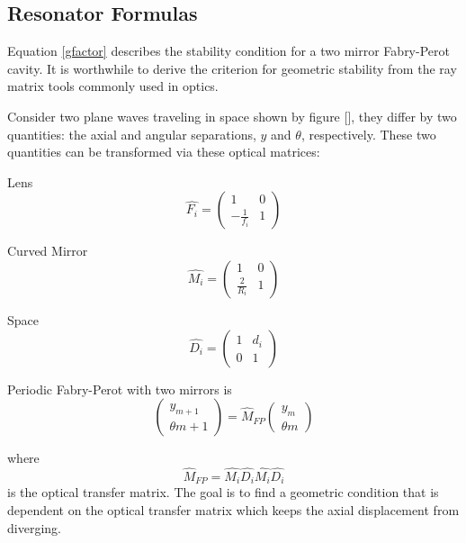 
\begin{appendices}

	\chapter{Resonator Formulas} \label{FPappendix}
	Equation \ref{gfactor} describes the stability condition for a two mirror Fabry-Perot cavity.  It is worthwhile to derive the criterion for geometric stability from the ray matrix tools commonly used in optics. 
	
	Consider two plane waves traveling in space shown by figure [], they differ by two quantities: the axial and angular separations,  $y$ and $\theta$, respectively.  These two quantities can be transformed via these optical matrices:
	
	Lens
	\begin{equation} \label{lens}
	\hat{F_i} = 
	\begin{pmatrix}
		1				&0			
	\\ 	-\frac{1}{f_i}	&1
	\end{pmatrix}
	\end{equation}
	
	Curved Mirror
	\begin{equation} \label{mirror}
	\hat{M_i} = 
	\begin{pmatrix}
		1				&0			
	\\ 	\frac{2}{R_i}	&1
	\end{pmatrix}
	\end{equation}
	
	Space
	\begin{equation} \label{space}
	\hat{D_i} = 
	\begin{pmatrix}
		1	& d_i		
	\\ 	0	&1
	\end{pmatrix}
	\end{equation}
	
	
	Periodic Fabry-Perot with two mirrors is 
	\begin{equation}
	\begin{pmatrix} y_{m+1} 
	\\ \theta{m+1}
	\end{pmatrix}
	= \hat{M}_{FP} \begin{pmatrix} y_{m} 
	\\ \theta{m}
	\end{pmatrix}
	\end{equation}

	where 
	\begin{equation}
	\hat{M}_{FP} = \hat{M_i} \hat{D_i} \hat{M_i} \hat{D_i}
	\end{equation}
	is the optical transfer matrix.
	The goal is to find a geometric condition that is dependent on the optical transfer matrix which keeps the axial displacement from diverging.
	

\end{appendices}
